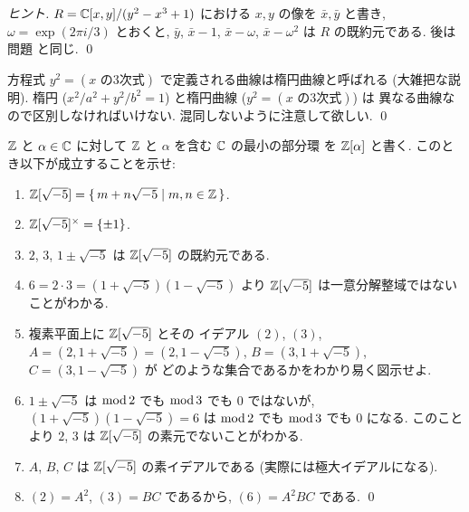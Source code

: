 \documentclass[12pt,twoside]{jarticle}
\begin{document}
\begin{proof}[ヒント]
 $R={\mathbb C}[x,y]/(y^2-x^3+1)$ における $x,y$ の像を $\bar{x},\bar{y}$ と書き, 
 $\omega=\exp(2\pi i/3)$ とおくと, 
 $\bar{y}$, $\bar{x}-1$, $\bar{x}-\omega$, $\bar{x}-\omega^2$ 
 は $R$ の既約元である. 
 後は問題  と同じ.
 \qed
\end{proof}

\begin{guide}[楕円曲線]
 方程式 $y^2=(\text{$x$ の3次式})$ で定義される曲線は楕円曲線と呼ばれる
 (大雑把な説明).
 楕円 ($x^2/a^2+y^2/b^2=1$) と楕円曲線 ($y^2=(\text{$x$ の3次式})$) は
 異なる曲線なので区別しなければいけない.
 混同しないように注意して欲しい.
 \qed
\end{guide}

\begin{question}
\label{q:Z[sqrt(-5)]-not-UFD}
  ${\mathbb Z}$ と $\alpha\in{\mathbb C}$ に対して ${\mathbb Z}$ と $\alpha$ を含む ${\mathbb C}$ の最小の部分環
  を ${\mathbb Z}[\alpha]$ と書く.  このとき以下が成立することを示せ:
  \begin{enumerate}
  \item ${\mathbb Z}[\sqrt{-5}] = \{\, m+n\sqrt{-5} \mid m,n\in{\mathbb Z} \,\}$.
  \item ${\mathbb Z}[\sqrt{-5}]^\times = \{\pm1\}$.
  \item $2$, $3$, $1\pm\sqrt{-5}$ は ${\mathbb Z}[\sqrt{-5}]$ の既約元である.
  \item $6=2\cdot 3=(1+\sqrt{-5})(1-\sqrt{-5})$ 
    より ${\mathbb Z}[\sqrt{-5}]$ は一意分解整域ではないことがわかる.
  \item 複素平面上に ${\mathbb Z}[\sqrt{-5}]$ とその
    イデアル $(2)$, $(3)$, $A=(2,1+\sqrt{-5})=(2,1-\sqrt{-5})$, 
    $B=(3,1+\sqrt{-5})$, $C=(3,1-\sqrt{-5})$ が
    どのような集合であるかをわかり易く図示せよ. 
  \item $1\pm\sqrt{-5}$ は $\mathop{\mathrm{mod}}\nolimits 2$ でも $\mathop{\mathrm{mod}}\nolimits 3$ でも $0$ ではないが,
    $(1+\sqrt{-5})(1-\sqrt{-5})=6$ は $\mathop{\mathrm{mod}}\nolimits 2$ でも $\mathop{\mathrm{mod}}\nolimits 3$ でも $0$ になる.
    このことより $2$, $3$ は ${\mathbb Z}[\sqrt{-5}]$ の素元でないことがわかる.
  \item $A$, $B$, $C$ は ${\mathbb Z}[\sqrt{-5}]$ の素イデアルである
   (実際には極大イデアルになる).
  \item $(2)=A^2$, $(3)=BC$ であるから, $(6)=A^2BC$ である.
    \qed
  \end{enumerate}
\end{question}
\end{document}

